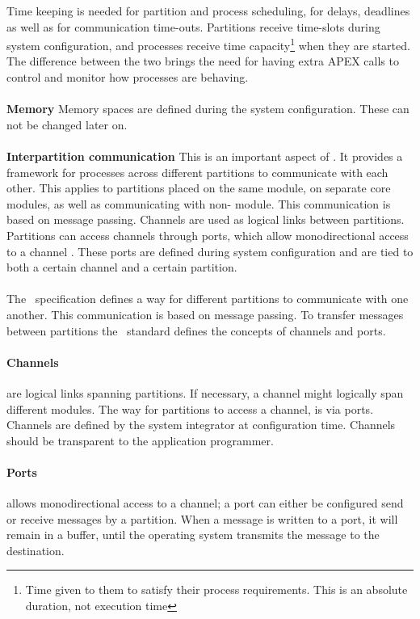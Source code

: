 Time keeping is needed for partition and process scheduling,
for delays, deadlines as well as for communication time-outs.
Partitions receive time-slots during system configuration, and
processes receive time capacity\footnote{Time given to them to satisfy
their process requirements. This is an absolute duration, not execution time} when they are started.
The difference between the two brings the need for having extra APEX calls
to control and monitor how processes are behaving.
\cite{arinc_page_25}
\\\\
\textbf{Memory}
Memory spaces are defined during the system configuration. These can not
be changed later on.
\\\\
\textbf{Interpartition communication}
This is an important aspect of \arinc{}. It provides a framework for processes across different partitions
to communicate with each other. This applies to partitions placed
on the same module, on separate core modules, as well as communicating with non-\arinc{} module.
This communication is based on message passing. Channels are used as
logical links between partitions. Partitions can access channels through
ports, which allow monodirectional access to a channel \cite{arinc_page_27}.
These ports are defined during system configuration and are tied to
both a certain channel and a certain partition.
\\\\
\iffalse
The \arinc\ specification defines a way for different partitions to communicate with one another.
This communication is based on message passing. To transfer messages between partitions the \arinc\ standard
defines the concepts of channels and ports.

\paragraph{Channels} are logical links spanning partitions. If necessary, 
a channel might logically span different modules. 
The way for partitions to access a channel, is via ports.
Channels are defined by the system integrator at configuration time.
Channels should be transparent to the application programmer.

\paragraph{Ports} allows monodirectional access to a channel;
a port can either be configured send or receive messages by a partition.
When a message is written to a port, it will remain in a buffer, until the operating system transmits the message to the destination.\\

